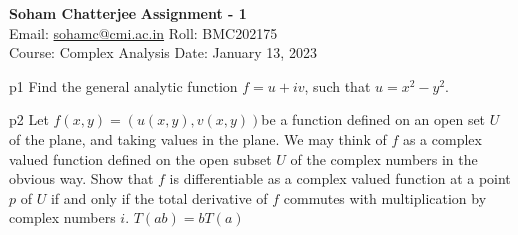 \documentclass[a4paper, 11pt]{article}
\begin{document}
	
	
	\textsf{\noindent \large\textbf{Soham Chatterjee} \hfill \textbf{Assignment - 1}\\
		Email: \href{sohamc@cmi.ac.in}{sohamc@cmi.ac.in} \hfill Roll: BMC202175\\
		\normalsize Course: Complex Analysis \hfill Date: January 13, 2023}
	
	
	\begin{problem}{%
		}{p1%
		}
				Find the general analytic function $f=u+iv$, such that $u=x^2-y^2$.
	
	\end{problem}
	
	
	
	
	\begin{problem}{%
		}{p2%
		}
		Let $f(x,y)=(u(x,y),v(x,y)) $be a function defined on an open set $U$ of the plane, and taking values in the plane. We may think of $f$ as a complex valued function defined on the open subset $U$ of the complex numbers in the obvious way. Show that $f$ is differentiable as a complex valued function at a point $p$ of $U$ if and only if the total derivative of $f$ commutes with multiplication by complex numbers $i$. $T(ab)=bT(a)$
	\end{problem}
	
\end{document}
